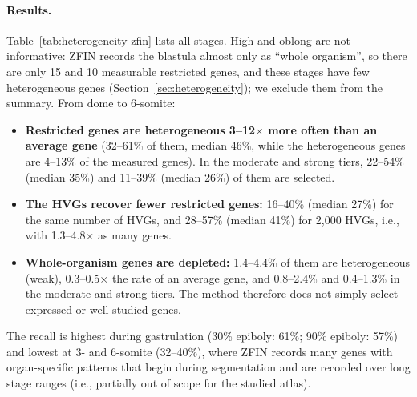 \documentclass[11pt,a4paper]{article}
\begin{document}
\paragraph{Results.} Table~\ref{tab:heterogeneity-zfin} lists all stages. High and oblong are not informative: ZFIN records the blastula almost only as ``whole organism'', so there are only 15 and 10 measurable restricted genes, and these stages have few heterogeneous genes (Section~\ref{sec:heterogeneity}); we exclude them from the summary. From dome to 6-somite:
\begin{itemize}
	\item \textbf{Restricted genes are heterogeneous 3--12$\times$ more often than an average gene} (32--61\% of them, median 46\%, while the heterogeneous genes are 4--13\% of the measured genes). In the moderate and strong tiers, 22--54\% (median 35\%) and 11--39\% (median 26\%) of them are selected.
	\item \textbf{The HVGs recover fewer restricted genes:} 16--40\% (median 27\%) for the same number of HVGs, and 28--57\% (median 41\%) for 2{,}000 HVGs, i.e., with 1.3--4.8$\times$ as many genes.
	\item \textbf{Whole-organism genes are depleted:} 1.4--4.4\% of them are heterogeneous (weak), 0.3--0.5$\times$ the rate of an average gene, and 0.8--2.4\% and 0.4--1.3\% in the moderate and strong tiers. The method therefore does not simply select expressed or well-studied genes.
\end{itemize}
The recall is highest during gastrulation (30\% epiboly: 61\%; 90\% epiboly: 57\%) and lowest at 3- and 6-somite (32--40\%), where ZFIN records many genes with organ-specific patterns that begin during segmentation and are recorded over long stage ranges (i.e., partially out of scope for the studied atlas).

\begin{table}[t]
	\centering
	\footnotesize
	\caption{Heterogeneous genes and ZFIN expression records (in situ hybridization, before 2018) per stage. All measured: genes with at least 10 UMIs in one library of the stage, and the percentage of them that are heterogeneous. ZFIN: measurable genes that are restricted (recorded in a localised structure at that stage) or recorded in the whole organism only, and the percentage of them selected as heterogeneous (Het., weak tier), among the same number of top Seurat HVGs (HVG$_k$), or among the 2{,}000 top HVGs. High and oblong have too few restricted genes to be informative.}
	\label{tab:heterogeneity-zfin}
	\setlength{\tabcolsep}{3pt}
	
\end{table}
\end{document}
